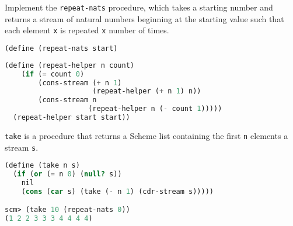 \question Implement the \texttt{repeat-nats} procedure, which takes a starting number and returns a stream of natural numbers beginning at the starting value such that each element \texttt{x} is repeated \texttt{x} number of times.

\begin{lstlisting}[language=Scheme]
(define (repeat-nats start)
\end{lstlisting}
\begin{solution}[3in]
\begin{lstlisting}[language=Scheme]
  (define (repeat-helper n count)
    (if (= count 0)
        (cons-stream (+ n 1)
                     (repeat-helper (+ n 1) n))
        (cons-stream n
                    (repeat-helper n (- count 1)))))
  (repeat-helper start start))
\end{lstlisting}
\end{solution}
\texttt{take} is a procedure that returns a Scheme list containing the first \texttt{n} elements a stream \texttt{s}.
\begin{lstlisting}[language=Scheme]
(define (take n s)
  (if (or (= n 0) (null? s))
    nil
    (cons (car s) (take (- n 1) (cdr-stream s)))))

scm> (take 10 (repeat-nats 0))
(1 2 2 3 3 3 4 4 4 4)
\end{lstlisting}
